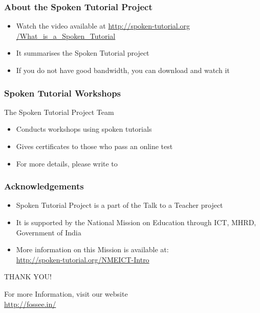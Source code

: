 \documentclass[17pt,compress]{beamer}
\begin{document}
\begin{frame}
\frametitle{About the Spoken Tutorial Project}
\begin{itemize}
\item Watch the video available at {\color{blue}\url{http://spoken-tutorial.org /What\_is\_a\_Spoken\_Tutorial}} 
\item It summarises the Spoken Tutorial project 
\item If you do not have good bandwidth, you can download and watch it
\end{itemize}
\end{frame}

\begin{frame}
\frametitle{Spoken Tutorial Workshops}The Spoken Tutorial Project Team 
\begin{itemize}
\item Conducts workshops using spoken tutorials 
\item Gives certificates to those who pass an online test 
\item For more details, please write to \\ 
\end{itemize}
\end{frame}

\begin{frame}
\frametitle{Acknowledgements}
\begin{itemize}
\item Spoken Tutorial Project is a part of the Talk to a Teacher  project 
\item It is supported by the National Mission on Education through  ICT, MHRD, Government of India 
\item More information on this Mission is available at: \\{\color{blue}\url{http://spoken-tutorial.org/NMEICT-Intro}}
\end{itemize}
\end{frame}

\begin{frame}

  \begin{block}{}
  \begin{center}
  {\Large THANK YOU!} 
  \end{center}
  \end{block}
\begin{block}{}
  \begin{center}
    For more Information, visit our website\\
    {\color{blue}\url{http://fossee.in/}}
  \end{center}  
  \end{block}
\end{frame}
\end{document}
